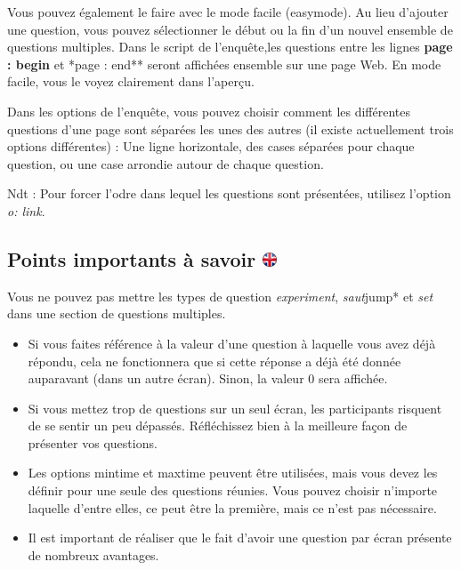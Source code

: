 \documentclass[
]{book}
\begin{document}
Vous pouvez également le faire avec le mode facile (easymode). Au lieu d'ajouter une question, vous pouvez sélectionner le début ou la fin d'un nouvel ensemble de questions multiples.
Dans le script de l'enquête,les questions entre les lignes \textbf{page : begin} et *page : end** seront affichées ensemble sur une page Web. En mode facile, vous le voyez clairement dans l'aperçu.

Dans les options de l'enquête, vous pouvez choisir comment les différentes questions d'une page sont séparées les unes des autres (il existe actuellement trois options différentes) : Une ligne horizontale, des cases séparées pour chaque question, ou une case arrondie autour de chaque question.

Ndt : Pour forcer l'odre dans lequel les questions sont présentées, utilisez l'option \emph{o: link}.

\hypertarget{points-importants-uxe0-savoir}{%
\subsection[Points importants à savoir ]{\texorpdfstring{Points importants à savoir \href{https://www.psytoolkit.org/doc3.4.0/online-survey-syntax.html\#_important_things_to_be_aware_of}{\protect\includegraphics{img/ukflag.png}}}{Points importants à savoir }}\label{points-importants-uxe0-savoir}}

Vous ne pouvez pas mettre les types de question \emph{experiment}, \emph{saut}jump* et \emph{set} dans une section de questions multiples.

\begin{itemize}
\item
  Si vous faites référence à la valeur d'une question à laquelle vous avez déjà répondu, cela ne fonctionnera que si cette réponse a déjà été donnée auparavant (dans un autre écran). Sinon, la valeur 0 sera affichée.
\item
  Si vous mettez trop de questions sur un seul écran, les participants risquent de se sentir un peu dépassés. Réfléchissez bien à la meilleure façon de présenter vos questions.
\item
  Les options mintime et maxtime peuvent être utilisées, mais vous devez les définir pour une seule des questions réunies. Vous pouvez choisir n'importe laquelle d'entre elles, ce peut être la première, mais ce n'est pas nécessaire.
\item
  Il est important de réaliser que le fait d'avoir une question par écran présente de nombreux avantages.
\end{itemize}
\end{document}
